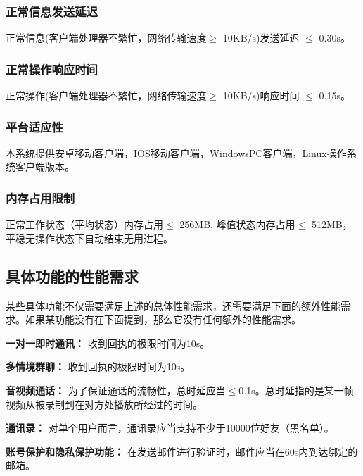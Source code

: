 \subsubsection{正常信息发送延迟}
正常信息(客户端处理器不繁忙，网络传输速度$\geq$ 10KB/s)发送延迟 $\leq$ 0.30s。
\subsubsection{正常操作响应时间}
正常操作(客户端处理器不繁忙，网络传输速度$\geq$ 10KB/s)响应时间 $\leq$ 0.15s。
\subsubsection{平台适应性}
本系统提供安卓移动客户端，IOS移动客户端，WindowsPC客户端，Linux操作系统客户端版本。
\subsubsection{内存占用限制}
正常工作状态（平均状态）内存占用$\leq$ 256MB, 峰值状态内存占用$\leq$ 512MB，平稳无操作状态下自动结束无用进程。

\subsection{具体功能的性能需求}
某些具体功能不仅需要满足上述的总体性能需求，还需要满足下面的额外性能需求。如果某功能没有在下面提到，那么它没有任何额外的性能需求。

\textbf{一对一即时通讯：} 收到回执的极限时间为10s。

\textbf{多情境群聊：} 收到回执的极限时间为10s。

\textbf{音视频通话：} 为了保证通话的流畅性，总时延应当$\leq$0.1s。总时延指的是某一帧视频从被录制到在对方处播放所经过的时间。

\textbf{通讯录：} 对单个用户而言，通讯录应当支持不少于10000位好友（黑名单）。

\textbf{账号保护和隐私保护功能：} 在发送邮件进行验证时，邮件应当在60s内到达绑定的邮箱。

